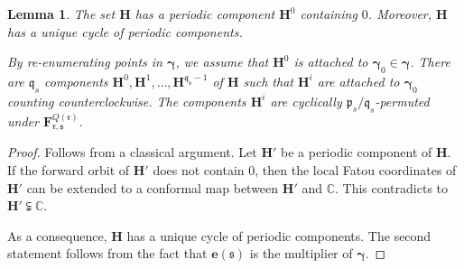 \documentclass{amsart}
\newcommand{\1}{{\mathbb 1 }}
\newcommand{\bF}{{\mathbf F}}
\newcommand{\bH}{{\mathbf H}}
\newcommand{\pp}{\mathfrak{p}}
\newcommand{\ee}{\mathbf e}
\renewcommand{\qq}{\mathfrak{q}}
\newcommand{\rr}{\mathfrak{r}}
\renewcommand{\ss}{\mathfrak{s}}
\newcommand{\C}{\mathbb{C}}
\newtheorem{lem}[thm]{Lemma}
\theoremstyle{remark}
\numberwithin{equation}{section}
\theoremstyle{definition}
\newcommand{\bgamma}{{\boldsymbol{ \gamma}}}
\theoremstyle{nonumberbreak}
\begin{document}
\begin{lem}
\label{lem:enum per comp of Frs}
The set $\bH$ has a periodic component $\bH^0$ containing $0$.  Moreover, $\bH$ has a unique cycle of periodic components. 

By re-enumerating points in $\bgamma$, we assume that $\bH^0$ is attached to $\bgamma_0\in \bgamma$. There are $\qq_s$ components $\bH^0,\bH^1,\dots, \bH^{\qq_\ss-1}$ of $\bH$ such that $\bH^i$ are attached to $\bgamma_0$ counting counterclockwise. The components $\bH^i$ are cyclically $\pp_s/\qq_s$-permuted under $\bF^{Q(\rr)}_{\rr,\ss}$.
 \end{lem}
\begin{proof}
Follows from a classical argument. Let $\bH'$ be a periodic component of $\bH$. If the forward orbit of $\bH'$ does not contain $0$, then the local Fatou coordinates of $\bH'$ can be extended to a conformal map between $\bH'$ and $\C$. This contradicts to $\bH'\subsetneqq\C$.

As a consequence, $\bH$ has a unique cycle of periodic components. The second statement follows from the fact that $\ee(\ss)$ is the multiplier of $\bgamma$.
\end{proof}
\end{document}
